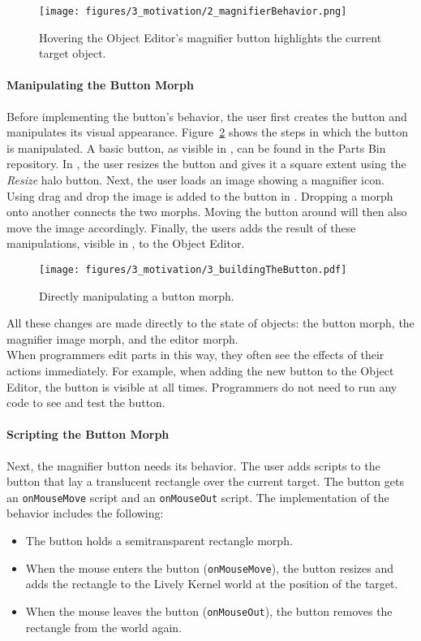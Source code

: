 \begin{figure}[h]
    \centering
    \texttt{[image: figures/3\_motivation/2\_magnifierBehavior.png]}
    \caption{Hovering the Object Editor's magnifier button highlights the current target object.}
    \label{fig:MagnifierBehavior}
\end{figure}

\paragraph{Manipulating the Button Morph}
Before implementing the button's behavior, the user first creates the button and manipulates its visual appearance.
Figure~\ref{fig:ButtonBuilding} shows the steps in which the button is manipulated.
A basic button, as visible in , can be found in the Parts Bin repository.
In , the user resizes the button and gives it a square extent using the \emph{Resize} halo button.
Next, the user loads an image showing a magnifier icon.
Using drag and drop the image is added to the button in .
Dropping a morph onto another connects the two morphs.
Moving the button around will then also move the image accordingly.
Finally, the users adds the result of these manipulations, visible in , to the Object Editor.

\begin{figure}[h]
    \centering
    \texttt{[image: figures/3\_motivation/3\_buildingTheButton.pdf]}
    \caption{Directly manipulating a button morph.}
    \label{fig:ButtonBuilding}
\end{figure}

All these changes are made directly to the state of objects: the button morph, the magnifier image morph, and the editor morph.\\
When programmers edit parts in this way, they often see the effects of their actions immediately.
For example, when adding the new button to the Object Editor, the button is visible at all times.
Programmers do not need to run any code to see and test the button.

\paragraph{Scripting the Button Morph}
Next, the magnifier button needs its behavior.
The user adds scripts to the button that lay a translucent rectangle over the current target.
The button gets an \lstinline{onMouseMove} script and an \lstinline{onMouseOut} script.
The implementation of the behavior includes the following: 
\begin{itemize}
    \item The button holds a semitransparent rectangle morph.
    \item When the mouse enters the button (\lstinline{onMouseMove}), the button resizes and adds the rectangle to the Lively Kernel world at the position of the target.
    \item When the mouse leaves the button (\lstinline{onMouseOut}), the button removes the rectangle from the world again.
\end{itemize}
 
